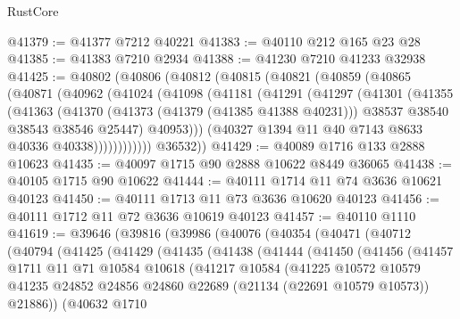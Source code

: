\begin{lexlean}{RustCore}
\begin{coremodule}
@41379 := @41377 @7212 @40221
@41383 := @40110 @212 @165 @23 @28
@41385 := @41383 @7210 @2934
@41388 := @41230 @7210 @41233 @32938
@41425 := @40802
    (@40806
      (@40812
        (@40815
          (@40821
            (@40859
              (@40865
                (@40871
                  (@40962
                    (@41024
                      (@41098
                        (@41181
                          (@41291
                            (@41297
                              (@41301
                                (@41355
                                  (@41363
                                    (@41370
                                      (@41373 (@41379 (@41385 @41388 @40231)))
                                      @38537
                                      @38540
                                      @38543
                                      @38546
                                      @25447)
                                    @40953)))
                              (@40327 @1394 @11 @40 @7143 @8633 @40336 @40338))))))))))))
        @36532))
@41429 := @40089 @1716 @133 @2888 @10623
@41435 := @40097 @1715 @90 @2888 @10622 @8449 @36065
@41438 := @40105 @1715 @90 @10622
@41444 := @40111 @1714 @11 @74 @3636 @10621 @40123
@41450 := @40111 @1713 @11 @73 @3636 @10620 @40123
@41456 := @40111 @1712 @11 @72 @3636 @10619 @40123
@41457 := @40110 @1110
@41619 := @39646
    (@39816
      (@39986
        (@40076
          (@40354
            (@40471
              (@40712
                (@40794
                  (@41425
                    (@41429
                      (@41435
                        (@41438
                          (@41444
                            (@41450
                              (@41456
                                (@41457
                                  @1711
                                  @11
                                  @71
                                  @10584
                                  @10618
                                  (@41217
                                    @10584
                                    (@41225
                                      @10572
                                      @10579
                                      @41235
                                      @24852
                                      @24856
                                      @24860
                                      @22689
                                      (@21134 (@22691 @10579 @10573))
                                      @21886))
                                  (@40632
                                    @1710

\end{coremodule}
\end{lexlean}
